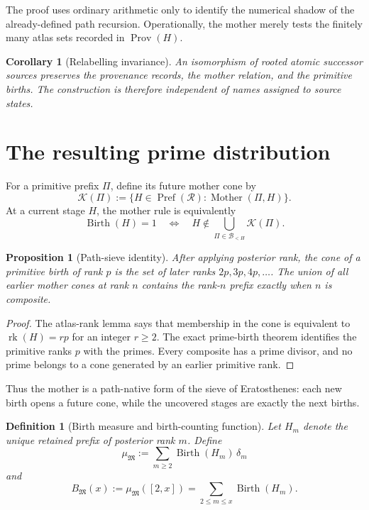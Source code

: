 \documentclass[11pt]{article}
\newtheorem{proposition}[theorem]{Proposition}
\newtheorem{corollary}[theorem]{Corollary}
\newtheorem{definition}[theorem]{Definition}
\newcommand{\Pref}{\operatorname{Pref}}
\newcommand{\rk}{\operatorname{rk}}
\newcommand{\Birth}{\operatorname{Birth}}
\newcommand{\Prov}{\operatorname{Prov}}
\newcommand{\Mother}{\operatorname{Mother}}
\begin{document}
The proof uses ordinary arithmetic only to identify the numerical shadow of
the already-defined path recursion.  Operationally, the mother merely tests
the finitely many atlas sets recorded in $\Prov(H)$.

\begin{corollary}[Relabelling invariance]
An isomorphism of rooted atomic successor sources preserves the provenance
records, the mother relation, and the primitive births.  The construction is
therefore independent of names assigned to source states.
\end{corollary}

\section{The resulting prime distribution}

For a primitive prefix $\Pi$, define its future mother cone by
\[
\mathcal K(\Pi)
:=
\{H\in\Pref(\mathscr R):\Mother(\Pi,H)\}.
\]
At a current stage $H$, the mother rule is equivalently
\[
\Birth(H)=1
\quad\Longleftrightarrow\quad
H\notin\bigcup_{\Pi\in\mathcal B_{<H}}\mathcal K(\Pi).
\]

\begin{proposition}[Path-sieve identity]
After applying posterior rank, the cone of a primitive birth of rank $p$ is
the set of later ranks $2p,3p,4p,\ldots$.  The union of all earlier mother
cones at rank $n$ contains the rank-$n$ prefix exactly when $n$ is composite.
\end{proposition}

\begin{proof}
The atlas-rank lemma says that membership in the cone is equivalent to
$\rk(H)=r p$ for an integer $r\ge2$.  The exact prime-birth theorem identifies
the primitive ranks $p$ with the primes.  Every composite has a prime divisor,
and no prime belongs to a cone generated by an earlier primitive rank.
\end{proof}

Thus the mother is a path-native form of the sieve of Eratosthenes: each new
birth opens a future cone, while the uncovered stages are exactly the next
births.

\begin{definition}[Birth measure and birth-counting function]
Let $H_m$ denote the unique retained prefix of posterior rank $m$.  Define
\[
\mu_{\mathfrak M}
:=
\sum_{m\ge2}\Birth(H_m)\,\delta_m
\]
and
\[
B_{\mathfrak M}(x)
:=
\mu_{\mathfrak M}([2,x])
=
\sum_{2\le m\le x}\Birth(H_m).
\]
\end{definition}
\end{document}
